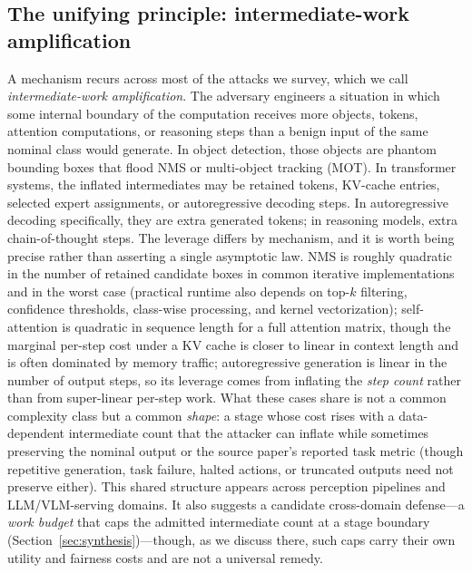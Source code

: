 \documentclass[acmsmall,screen,review,nonacm]{acmart}
\begin{document}
\subsection{The unifying principle: intermediate-work amplification}
\label{sec:unifying}

A mechanism recurs across most of the attacks we survey, which we call \emph{intermediate-work amplification}. The adversary engineers a situation in which some internal boundary of the computation receives more objects, tokens, attention computations, or reasoning steps than a benign input of the same nominal class would generate. In object detection, those objects are phantom bounding boxes that flood NMS or multi-object tracking (MOT). In transformer systems, the inflated intermediates may be retained tokens, KV-cache entries, selected expert assignments, or autoregressive decoding steps. In autoregressive decoding specifically, they are extra generated tokens; in reasoning models, extra chain-of-thought steps. The leverage differs by mechanism, and it is worth being precise rather than asserting a single asymptotic law. NMS is roughly quadratic in the number of retained candidate boxes in common iterative implementations and in the worst case (practical runtime also depends on top-$k$ filtering, confidence thresholds, class-wise processing, and kernel vectorization); self-attention is quadratic in sequence length for a full attention matrix, though the marginal per-step cost under a KV cache is closer to linear in context length and is often dominated by memory traffic; autoregressive generation is linear in the number of output steps, so its leverage comes from inflating the \emph{step count} rather than from super-linear per-step work. What these cases share is not a common complexity class but a common \emph{shape}: a stage whose cost rises with a data-dependent intermediate count that the attacker can inflate while sometimes preserving the nominal output or the source paper's reported task metric (though repetitive generation, task failure, halted actions, or truncated outputs need not preserve either). This shared structure appears across perception pipelines and LLM/VLM-serving domains. It also suggests a candidate cross-domain defense---a \emph{work budget} that caps the admitted intermediate count at a stage boundary (Section~\ref{sec:synthesis})---though, as we discuss there, such caps carry their own utility and fairness costs and are not a universal remedy.
\end{document}
